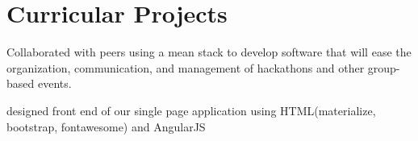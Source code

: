 \documentclass[]{deedy-resume-openfont}
\begin{document}
\begin{minipage}[t]{0.66\textwidth}
\section{Curricular Projects}
\begin{tightemize}
\item Collaborated with peers using a mean stack to develop software that will ease the organization, communication, and management of hackathons and other group-based events.
\item designed front end of our single page application using HTML(materialize, bootstrap, fontawesome) and AngularJS
\end{tightemize}
\sectionsep





\end{minipage}
\end{document}
